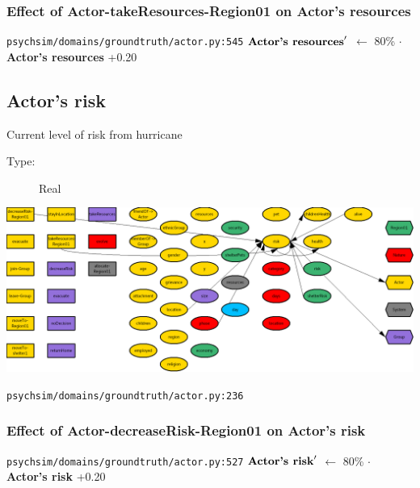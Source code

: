 \documentclass{article}%
\begin{document}
%
\subsubsection{Effect of Actor{-}takeResources{-}Region01 on Actor's resources}%
\label{ssubsec:Effect of Actor{-}takeResources{-}Region01 on Actor's resources}%
\begin{flushleft}%
\verb|psychsim/domains/groundtruth/actor.py:545|%
\linebreak%
$\mbox{\textbf{Actor's resources}} '$%
$\leftarrow$%
80\%%
$\cdot$%
\textbf{Actor's resources}%
+0.20%
\end{flushleft}

%
\subsection{Actor's risk}%
\label{subsec:Actor's risk}%
Current level of risk from hurricane%
\begin{description}%
\item[Type:]%
Real%
\end{description}%
\includegraphics[width=\textwidth]{images/riskOfActor.png}%
\begin{flushleft}%
\verb|psychsim/domains/groundtruth/actor.py:236|%
\end{flushleft}%
\subsubsection{Effect of Actor{-}decreaseRisk{-}Region01 on Actor's risk}%
\label{ssubsec:Effect of Actor{-}decreaseRisk{-}Region01 on Actor's risk}%
\begin{flushleft}%
\verb|psychsim/domains/groundtruth/actor.py:527|%
\linebreak%
$\mbox{\textbf{Actor's risk}} '$%
$\leftarrow$%
80\%%
$\cdot$%
\textbf{Actor's risk}%
+0.20%
\end{flushleft}

%
\end{document}
